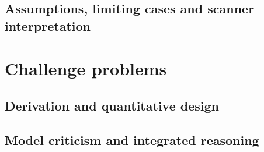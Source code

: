 \subsection{Assumptions, limiting cases and scanner interpretation}

\section{Challenge problems}
\label{sec:11:challenge-problems}
\subsection{Derivation and quantitative design}
\subsection{Model criticism and integrated reasoning}
